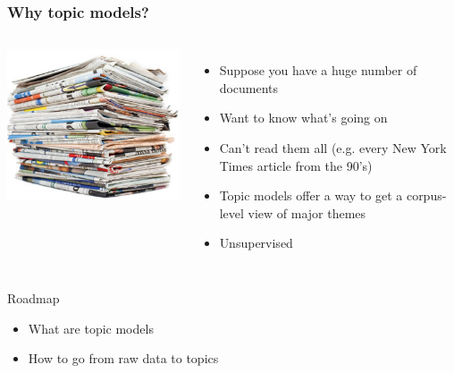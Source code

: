 

\providecommand{\graphscale}{0.6}




\begin{frame}

	\frametitle{Why topic models?}

	\begin{columns}


	\includegraphics[width=1\linewidth]{topic_models/newspapers}


	\begin{itemize}
		\item Suppose you have a huge number of documents
		\item Want to know what's going on
		\item Can't read them all (e.g. every New York Times article from the 90's)
		\item Topic models offer a way to get a corpus-level view of major themes
		\pause
		\item Unsupervised
	\end{itemize}


	\end{columns}

\end{frame}

\begin{frame}{Roadmap}

	\begin{itemize}
		\item What are topic models
		\item How to go from raw data to topics
	\end{itemize}

\end{frame}



